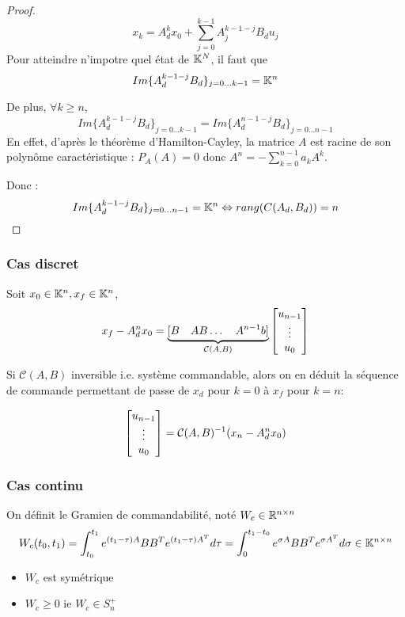 \documentclass[main.tex]{subfiles}
\begin{document}
\begin{proof}
\[x_k= A_d^k x_0 + \sum_{j=0}^{k-1}A_j^{k-1-j}B_du_j\]
Pour atteindre n'impotre quel état de $\mathbb{K}^N$, il faut que
\[ Im\{A_d^{k-1-j}B_d\}_{j=0...k-1} = \mathbb{K}^n \]

De plus, $\forall k \geq n$,
\[ Im\{A_d^{k-1-j}B_d\}_{j=0...k-1} =  Im\{A_d^{n-1-j}B_d\}_{j=0...n-1} \]
En effet, d'après le théorème d'Hamilton-Cayley, la matrice $A$ est racine de son polynôme caractéristique : $P_A(A) = 0$ donc $A^n = -\sum_{k=0}^{n-1}a_k A^k$.

Donc :
\[Im\{A_d^{k-1-j}B_d\}_{j=0...n-1} = \mathbb{K}^n \Leftrightarrow rang(C(A_d,B_d)) = n\]
\end{proof}
\subsubsection{Cas discret}
\begin{prop}
Soit $x_0\in\mathbb{K}^n, x_f\in\mathbb{K}^n$,
\[x_f-A_d^nx_0 = \underbrace{[B \quad AB \dots \quad A^{n-1}b]}_{\mathcal{C}(A,B)}\begin{bmatrix} u_{n-1}\\ \vdots\\ u_0 \end{bmatrix}\]

Si $\mathcal{C}(A,B)$ inversible i.e. système commandable, alors on en déduit la séquence de commande permettant de passe de $x_d$ pour $k=0$ à $x_f$ pour $k=n$:

\[
\begin{bmatrix} u_{n-1}\\ \vdots\\ u_0 \end{bmatrix} = \mathcal{C}(A,B)^{-1}(x_n-A_d^nx_0)
\]
\end{prop}

\subsubsection{Cas continu}

\begin{defin}
On définit le Gramien de commandabilité, noté $W_c\in\mathbb{R}^{n\times n}$
\[W_c(t_0,t_1) = \int_{t_0}^{t_1} e^{(t_1-\tau)A} BB^T e^{(t_1-\tau)A^T} d\tau = \int_0^{t_1-t_0}e^{\sigma A}BB^Te^{\sigma A^T}d\sigma  \in \mathbb{K}^{n\times n}\]
\end{defin}

\begin{prop}
  \begin{itemize}
  \item $W_c$ est symétrique
  \item $W_c \ge 0$ ie $W_c \in S_n^+$
  \end{itemize}
\end{prop}
\end{document}
